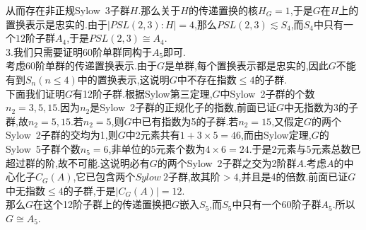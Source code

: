 \documentclass[b5paper]{ctexart}
\begin{document}
从而存在非正规Sylow~3子群$H$.那么关于$H$的传递置换的核$H_G=1$,于是$G$在$H$上的置换表示是忠实的.由于$|PSL(2,3):H|=4$,那么$PSL(2,3)\lesssim S_4$,而$S_4$中只有一个$12$阶子群$A_4$,于是$PSL(2,3)\cong A_4$.\\
3.我们只需要证明$60$阶单群同构于$A_5$即可.\\
考虑$60$阶单群的传递置换表示.由于$G$是单群,每个置换表示都是忠实的,因此$G$不能有到$S_n(n\leq 4)$中的置换表示,这说明$G$中不存在指数$\leq 4$的子群.\\
下面我们证明$G$有12阶子群.根据Sylow第三定理,$G$中Sylow~2子群的个数$n_2=3,5,15$.因为$n_2$是Sylow~2子群的正规化子的指数,前面已证$G$中无指数为3的子群,故$n_2=5,15$.若$n_2=5$,则$G$中已有指数为5的子群.若$n_2=15$,又假定$G$的两个Sylow~2子群的交均为1,则$G$中2元素共有$1+3\times 5=46$,而由Sylow定理,$G$的Sylow~5子群个数$n_5=6$,非单位的5元素个数为$4\times 6=24.$于是2元素与5元素总数已超过群的阶,故不可能.这说明必有$G$的两个Sylow~2子群之交为2阶群$A$.考虑$A$的中心化子$C_G(A)$,它已包含两个$Sylow~2$子群,故其阶$>4$,并且是4的倍数.前面已证$G$中无指数$\leq 4$的子群,于是$|C_G(A)|=12$.\\
那么$G$在这个12阶子群上的传递置换把$G$嵌入$S_5$,而$S_5$中只有一个60阶子群$A_5$.所以$G\cong A_5$.
\end{document}
